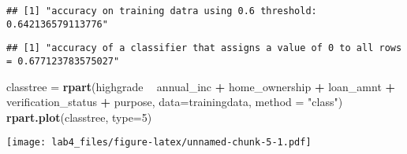 \documentclass[
]{article}
\newenvironment{Shaded}{\begin{snugshade}}{\end{snugshade}}
\newcommand{\DataTypeTok}[1]{\textcolor[rgb]{0.13,0.29,0.53}{#1}}
\newcommand{\DecValTok}[1]{\textcolor[rgb]{0.00,0.00,0.81}{#1}}
\newcommand{\KeywordTok}[1]{\textcolor[rgb]{0.13,0.29,0.53}{\textbf{#1}}}
\newcommand{\NormalTok}[1]{#1}
\newcommand{\OperatorTok}[1]{\textcolor[rgb]{0.81,0.36,0.00}{\textbf{#1}}}
\newcommand{\StringTok}[1]{\textcolor[rgb]{0.31,0.60,0.02}{#1}}
\begin{document}
\begin{verbatim}
## [1] "accuracy on training datra using 0.6 threshold: 0.642136579113776"
\end{verbatim}

\begin{Shaded}
\end{Shaded}

\begin{verbatim}
## [1] "accuracy of a classifier that assigns a value of 0 to all rows = 0.677123783575027"
\end{verbatim}

\begin{Shaded}
\begin{Highlighting}[]
\NormalTok{classtree =}\StringTok{ }\KeywordTok{rpart}\NormalTok{(highgrade }\OperatorTok{~}\StringTok{ }\NormalTok{annual_inc }\OperatorTok{+}\StringTok{ }\NormalTok{home_ownership }\OperatorTok{+}\StringTok{ }\NormalTok{loan_amnt }\OperatorTok{+}\StringTok{ }\NormalTok{verification_status }\OperatorTok{+}\StringTok{ }\NormalTok{purpose, }\DataTypeTok{data=}\NormalTok{trainingdata, }\DataTypeTok{method =} \StringTok{"class"}\NormalTok{)}
\KeywordTok{rpart.plot}\NormalTok{(classtree, }\DataTypeTok{type=}\DecValTok{5}\NormalTok{)}
\end{Highlighting}
\end{Shaded}

\texttt{[image: lab4\_files/figure-latex/unnamed-chunk-5-1.pdf]}

\begin{Shaded}
\end{Shaded}
\end{document}

